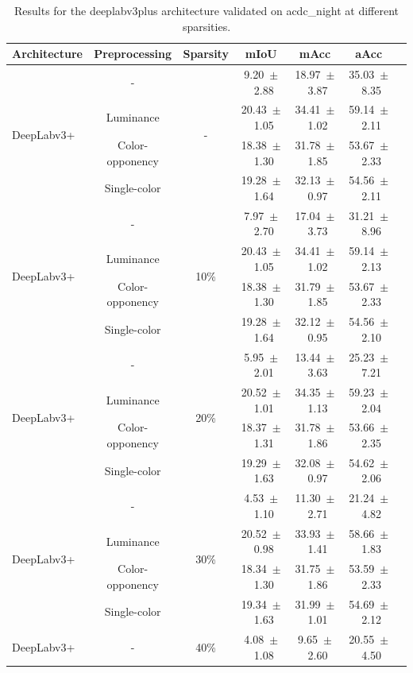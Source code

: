 \begin{table}[h]
\centering
\caption{Results for the deeplabv3plus architecture validated on acdc_night at different sparsities.}
\begin{tabular}{@{}lccc ccc@{}}
\toprule
Architecture & Preprocessing & Sparsity & mIoU & mAcc & aAcc \\
\midrule

\multirow{4}{*}{DeepLabv3+} & - & \multirow{4}{*}{-} & 9.20~$\pm$~2.88 & 18.97~$\pm$~3.87 & 35.03~$\pm$~8.35 \\
& Luminance & & 20.43~$\pm$~1.05 & 34.41~$\pm$~1.02 & 59.14~$\pm$~2.11 \\
& Color-opponency & & 18.38~$\pm$~1.30 & 31.78~$\pm$~1.85 & 53.67~$\pm$~2.33 \\
& Single-color & & 19.28~$\pm$~1.64 & 32.13~$\pm$~0.97 & 54.56~$\pm$~2.11 \\
\midrule
\multirow{4}{*}{DeepLabv3+} & - & \multirow{4}{*}{10\%} & 7.97~$\pm$~2.70 & 17.04~$\pm$~3.73 & 31.21~$\pm$~8.96 \\
& Luminance & & 20.43~$\pm$~1.05 & 34.41~$\pm$~1.02 & 59.14~$\pm$~2.13 \\
& Color-opponency & & 18.38~$\pm$~1.30 & 31.79~$\pm$~1.85 & 53.67~$\pm$~2.33 \\
& Single-color & & 19.28~$\pm$~1.64 & 32.12~$\pm$~0.95 & 54.56~$\pm$~2.10 \\
\midrule
\multirow{4}{*}{DeepLabv3+} & - & \multirow{4}{*}{20\%} & 5.95~$\pm$~2.01 & 13.44~$\pm$~3.63 & 25.23~$\pm$~7.21 \\
& Luminance & & 20.52~$\pm$~1.01 & 34.35~$\pm$~1.13 & 59.23~$\pm$~2.04 \\
& Color-opponency & & 18.37~$\pm$~1.31 & 31.78~$\pm$~1.86 & 53.66~$\pm$~2.35 \\
& Single-color & & 19.29~$\pm$~1.63 & 32.08~$\pm$~0.97 & 54.62~$\pm$~2.06 \\
\midrule
\multirow{4}{*}{DeepLabv3+} & - & \multirow{4}{*}{30\%} & 4.53~$\pm$~1.10 & 11.30~$\pm$~2.71 & 21.24~$\pm$~4.82 \\
& Luminance & & 20.52~$\pm$~0.98 & 33.93~$\pm$~1.41 & 58.66~$\pm$~1.83 \\
& Color-opponency & & 18.34~$\pm$~1.30 & 31.75~$\pm$~1.86 & 53.59~$\pm$~2.33 \\
& Single-color & & 19.34~$\pm$~1.63 & 31.99~$\pm$~1.01 & 54.69~$\pm$~2.12 \\
\midrule
\multirow{4}{*}{DeepLabv3+} & - & \multirow{4}{*}{40\%} & 4.08~$\pm$~1.08 & 9.65~$\pm$~2.60 & 20.55~$\pm$~4.50 \\

\end{tabular}
\end{table}
